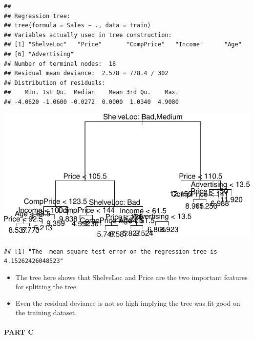 \documentclass[
]{article}
\begin{document}
\begin{verbatim}
## 
## Regression tree:
## tree(formula = Sales ~ ., data = train)
## Variables actually used in tree construction:
## [1] "ShelveLoc"   "Price"       "CompPrice"   "Income"      "Age"        
## [6] "Advertising"
## Number of terminal nodes:  18 
## Residual mean deviance:  2.578 = 778.4 / 302 
## Distribution of residuals:
##    Min. 1st Qu.  Median    Mean 3rd Qu.    Max. 
## -4.0620 -1.0600 -0.0272  0.0000  1.0340  4.9080
\end{verbatim}

\begin{center}\includegraphics{Disha_Gandhi_Take_Home_Exam_PDF_files/figure-latex/unnamed-chunk-69-1} \end{center}

\begin{verbatim}
## [1] "The  mean square test error on the regression tree is 4.15262426048523"
\end{verbatim}

\begin{itemize}
\item
  The tree here shows that ShelveLoc and Price are the two important
  features for splitting the tree.
\item
  Even the residual deviance is not so high implying the tree was fit
  good on the training dataset.
\end{itemize}

\hypertarget{part-c-4}{%
\paragraph{\texorpdfstring{{PART C}}{PART C}}\label{part-c-4}}
\end{document}

